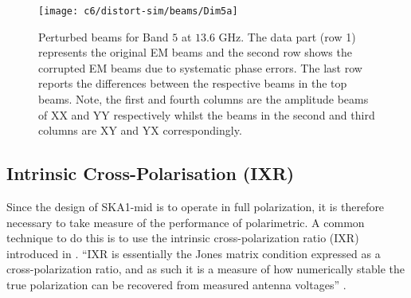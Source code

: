\begin{figure}
\begin{minipage}[H]{\linewidth}
\centering
\texttt{[image: c6/distort-sim/beams/Dim5a]}
\caption{\label{fig:bandD5a} Perturbed beams for Band $5$ at $13.6$ GHz. The data part (row 1) represents the original EM beams and the 
second row shows the corrupted EM beams due to systematic phase errors. The last row reports the differences between the respective beams in the top beams.
 Note, the first and fourth columns are the amplitude beams of XX and YY respectively whilst the beams in the second and third columns are XY and YX correspondingly.}
\end{minipage}
\end{figure}
\FloatBarrier


\subsection{Intrinsic Cross-Polarisation (IXR)}	  \label{chap6:ixr} 

Since the design of SKA1-mid is to operate in full polarization, it is therefore necessary to take measure of the performance of polarimetric. A common technique to do this is to use the intrinsic cross-polarization ratio (IXR) introduced in \cite{carozzi2011fundamental}.  \enquote{IXR is essentially the Jones matrix condition expressed as a cross-polarization ratio, and as such it is a measure of how numerically stable the true polarization can be recovered from measured antenna voltages} \citep{7303206}.

